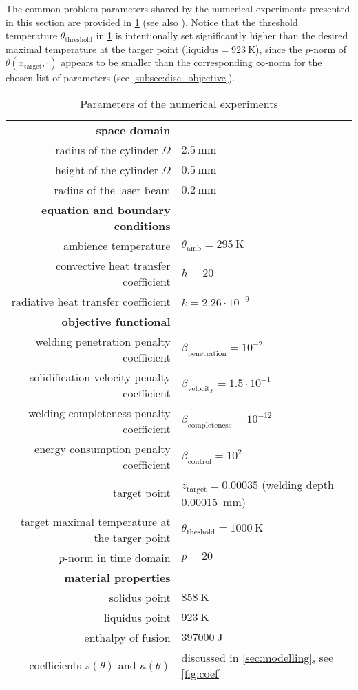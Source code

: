 The common problem parameters shared by the numerical experiments presented in this section are provided in \cref{tab:parameters} (see also \cite[\texttt{env/problem.py}]{optcontrol_github}). Notice that the threshold temperature $\theta_\text{threshold}$ in \cref{tab:parameters} is intentionally set significantly higher than the desired maximal temperature at the targer point ($\text{liquidus} = \SI{923}{\K}$), since the $p$-norm of $\theta(x_\text{target}, \cdot)$ appears to be smaller than the corresponding $\infty$-norm for the chosen list of parameters (see \cref{subsec:disc_objective}).

\begin{table}[ht]
	\begin{tabular}{rl}
		\textbf{space domain} \\
		radius of the cylinder $\Omega$ & $\SI{2.5}{\mm}$ \\
		height of the cylinder $\Omega$ & $\SI{0.5}{\mm}$ \\
		radius of the laser beam        & $\SI{0.2}{\mm}$\\[0.5em]

		\textbf{equation and boundary conditions} \\
		ambience temperature & $\theta_\text{amb} = \SI{295}{\K}$ \\
		convective heat transfer coefficient & $h = 20$ \\
		radiative heat transfer coefficient & $k = 2.26 \cdot 10^{-9}$\\[0.5em]

		\textbf{objective functional} \\
		welding penetration penalty coefficient & $\beta_\text{penetration} = 10^{-2}$ \\
		solidification velocity penalty coefficient & $\beta_\text{velocity} = 1.5 \cdot 10^{-1}$ \\
		welding completeness penalty coefficient & $\beta_\text{completeness} = 10^{-12}$ \\
		energy consumption penalty coefficient & $\beta_\text{control} = 10^{2}$ \\
		target point & $z_\text{target} = 0.00035$ (welding depth \SI{0.00015}{\mm}) \\
		target maximal temperature at the targer point & $\theta_\text{theshold} = \SI{1000}{\K}$ \\
		$p$-norm in time domain& $p = 20$\\[0.5em]

		\textbf{material properties} \\
		solidus point & $\SI{858}{\K}$ \\
		liquidus point & $\SI{923}{\K}$ \\
		enthalpy of fusion & $\SI{397000}{\J}$ \\
		coefficients $s(\theta)$ and $\kappa(\theta)$ & discussed in \cref{sec:modelling}, see \cref{fig:coef} \\
	\end{tabular}
	\caption{Parameters of the numerical experiments}
	\label{tab:parameters}
\end{table}

